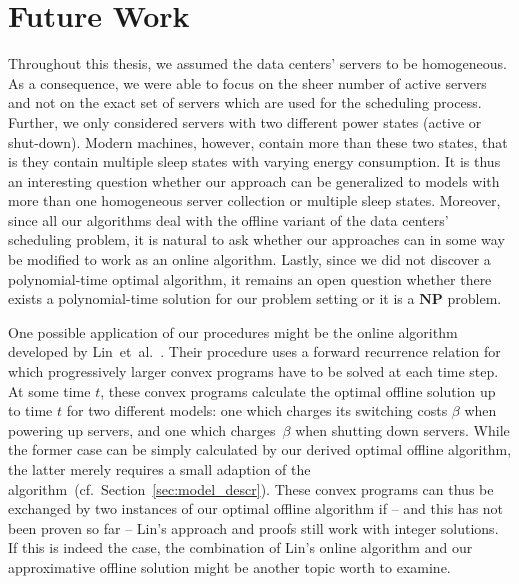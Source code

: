 \section{Future Work}
Throughout this thesis, we assumed the data centers' servers to be homogeneous. As a consequence, we were able to focus on the sheer number of active servers and not on the exact set of servers which are used for the scheduling process. Further, we only considered servers with two different power states (active or shut-down). Modern machines, however, contain more than these two states, that is they contain multiple sleep states with varying energy consumption. It is thus an interesting question whether our approach can be generalized to models with more than one homogeneous server collection or multiple sleep states. 
Moreover, since all our algorithms deal with the offline variant of the data centers' scheduling problem, it is natural to ask whether our approaches can in some way be modified to work as an online algorithm. Lastly, since we did not discover a polynomial-time optimal algorithm, it remains an open question whether there exists a polynomial-time solution for our problem setting or it is a $\textbf{NP}$ problem.

One possible application of our procedures might be the online algorithm developed by Lin~et~al.~\parencite{dyn-right-sizing}. Their procedure uses a forward recurrence relation for which progressively larger convex programs have to be solved at each time step. At some time $t$, these convex programs calculate the optimal offline solution up to time $t$ for two different models: one which charges its switching costs $\beta$ when powering up servers, and one which charges~$\beta$ when shutting down servers. While the former case can be simply calculated by our derived optimal offline algorithm, the latter merely requires a small adaption of the algorithm~(cf.\ Section~\ref{sec:model_descr}). These convex programs can thus be exchanged by two instances of our optimal offline algorithm if -- and this has not been proven so far -- Lin's approach and proofs still work with integer solutions. If this is indeed the case, the combination of Lin's online algorithm and our approximative offline solution might be another topic worth to examine.
